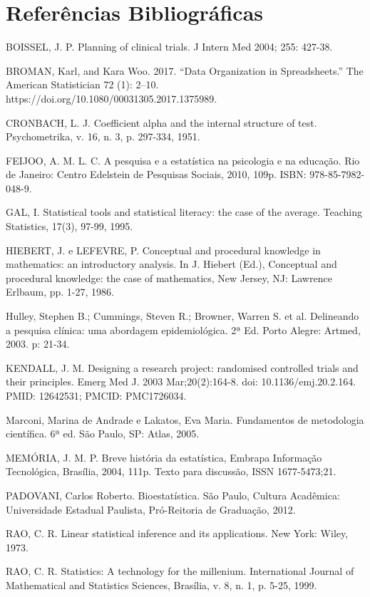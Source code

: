 \chapter{Referências Bibliográficas}

BOISSEL, J. P. Planning of clinical trials. J Intern Med 2004; 255: 427-38.\vskip0.3cm

BROMAN, Karl, and Kara Woo. 2017. “Data Organization in Spreadsheets.” The American Statistician 72 (1): 2–10. https://doi.org/10.1080/00031305.2017.1375989.\vskip0.3cm


CRONBACH, L. J. Coefficient alpha and the internal structure of test. Psychometrika, v. 16, n. 3, p. 297-334, 1951.\vskip0.3cm


FEIJOO, A. M. L. C. A pesquisa e a estatística na psicologia e na educação. Rio de Janeiro:
Centro Edelstein de Pesquisas Sociais, 2010, 109p. ISBN: 978-85-7982-048-9.\vskip0.3cm

GAL, I. Statistical tools and statistical literacy: the case of the average. Teaching
Statistics, 17(3), 97-99, 1995.\vskip0.3cm

HIEBERT, J. e LEFEVRE, P. Conceptual and procedural knowledge in mathematics: an
introductory analysis. In J. Hiebert (Ed.), Conceptual and procedural knowledge: the
case of mathematics, New Jersey, NJ: Lawrence Erlbaum, pp. 1-27, 1986.\vskip0.3cm

Hulley, Stephen B.; Cummings, Steven R.; Browner, Warren S. et al. Delineando a pesquisa clínica: uma abordagem epidemiológica. 2ª Ed. Porto Alegre: Artmed, 2003. p: 21-34.\vskip0.3cm


KENDALL, J. M. Designing a research project: randomised controlled trials and their principles. Emerg Med J. 2003 Mar;20(2):164-8. doi: 10.1136/emj.20.2.164. PMID: 12642531; PMCID: PMC1726034.\vskip0.3cm

Marconi, Marina de Andrade e Lakatos, Eva Maria. Fundamentos de metodologia científica. 6ª ed. São Paulo, SP: Atlas, 2005.\vskip0.3cm

MEMÓRIA, J. M. P. Breve história da estatística, Embrapa Informação Tecnológica, Brasília, 2004, 111p. Texto para discussão, ISSN 1677-5473;21. \vskip0.3cm


PADOVANI, Carlos Roberto. Bioestatística. São Paulo, Cultura Acadêmica:
Universidade Estadual Paulista, Pró-Reitoria de Graduação, 2012.\vskip0.3cm

RAO, C. R. Linear statistical inference and its applications. New York: Wiley, 1973.\vskip0.3cm

RAO, C. R. Statistics: A technology for the millenium. International Journal of Mathematical and Statistics Sciences, Brasília, v. 8, n. 1, p. 5-25, 1999.\vskip0.3cm

